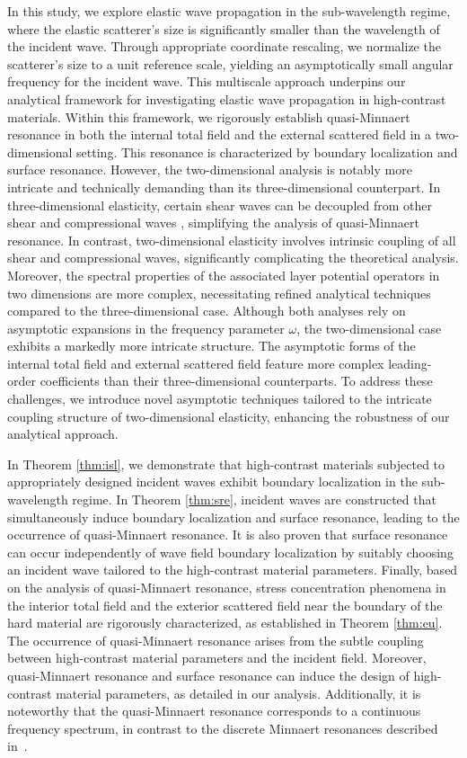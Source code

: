 \documentclass[11pt,reqno,twoside]{amsart}
\theoremstyle{definition}
\theoremstyle{remark}
\numberwithin{equation}{section}
\begin{document}
In this study, we explore elastic wave propagation in the sub-wavelength regime, where the elastic scatterer's size is significantly smaller than the wavelength of the incident wave. Through appropriate coordinate rescaling, we normalize the scatterer's size to a unit reference scale, yielding an asymptotically small angular frequency for the incident wave. This multiscale approach underpins our analytical framework for investigating elastic wave propagation in high-contrast materials. Within this framework, we rigorously establish quasi-Minnaert resonance in both the internal total field and the external scattered field in a two-dimensional setting. This resonance is characterized by boundary localization and surface resonance. However, the two-dimensional analysis is notably more intricate and technically demanding than its three-dimensional counterpart. In three-dimensional elasticity, certain shear waves can be decoupled from other shear and compressional waves \cite{DTL}, simplifying the analysis of quasi-Minnaert resonance. In contrast, two-dimensional elasticity involves intrinsic coupling of all shear and compressional waves, significantly complicating the theoretical analysis. Moreover, the spectral properties of the associated layer potential operators in two dimensions are more complex, necessitating refined analytical techniques compared to the three-dimensional case. Although both analyses rely on asymptotic expansions in the frequency parameter $\omega$, the two-dimensional case exhibits a markedly more intricate structure. The asymptotic forms of the internal total field and external scattered field feature more complex leading-order coefficients than their three-dimensional counterparts. To address these challenges, we introduce novel asymptotic techniques tailored to the intricate coupling structure of two-dimensional elasticity, enhancing the robustness of our analytical approach.


In Theorem \ref{thm:isl}, we demonstrate that high-contrast materials subjected to appropriately designed incident waves exhibit boundary localization in the sub-wavelength regime. In Theorem \ref{thm:sre}, incident waves are constructed that simultaneously induce boundary localization and surface resonance, leading to the occurrence of quasi-Minnaert resonance. It is also proven that surface resonance can occur independently of wave field boundary localization by suitably choosing an incident wave tailored to the high-contrast material parameters. Finally, based on the analysis of quasi-Minnaert resonance, stress concentration phenomena in the interior total field and the exterior scattered field near the boundary of the hard material are rigorously characterized, as established in Theorem \ref{thm:eu}. The occurrence of quasi-Minnaert resonance arises from the subtle coupling between high-contrast material parameters and the incident field. Moreover, quasi-Minnaert resonance and surface resonance can induce the design of high-contrast material parameters, as detailed in our analysis. Additionally, it is noteworthy that the quasi-Minnaert resonance corresponds to a continuous frequency spectrum, in contrast to the discrete Minnaert resonances described in~\cite{AFGL,lizou}.
\end{document}
